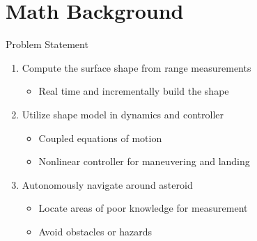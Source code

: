 \section[Problem Statement]{Math Background}
\begin{frame}{Problem Statement}
\begin{enumerate}
    \item<1-> Compute the surface shape from range measurements
        \begin{itemize}
            \item Real time and incrementally build the shape
        \end{itemize}
    \item<2-> Utilize shape model in dynamics and controller
        \begin{itemize}
            \item Coupled equations of motion 
            \item Nonlinear controller for maneuvering and landing
        \end{itemize}
    \item<3-> Autonomously navigate around asteroid 
        \begin{itemize}
            \item Locate areas of poor knowledge for measurement
            \item Avoid obstacles or hazards
        \end{itemize}
\end{enumerate}
\end{frame}

